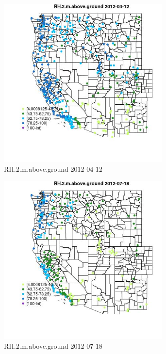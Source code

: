 \begin{figure} 
\centering  
\includegraphics[width=0.77\textwidth]{Code_Outputs/Report_ML_input_PM25_Step4_part_e_de_duplicated_aves_compiled_2019-05-14wNAs_MapObsRH2maboveground2012-04-12.jpg} 
\caption{\label{fig:Report_ML_input_PM25_Step4_part_e_de_duplicated_aves_compiled_2019-05-14wNAsMapObsRH2maboveground2012-04-12}RH.2.m.above.ground 2012-04-12} 
\end{figure} 
 

\begin{figure} 
\centering  
\includegraphics[width=0.77\textwidth]{Code_Outputs/Report_ML_input_PM25_Step4_part_e_de_duplicated_aves_compiled_2019-05-14wNAs_MapObsRH2maboveground2012-07-18.jpg} 
\caption{\label{fig:Report_ML_input_PM25_Step4_part_e_de_duplicated_aves_compiled_2019-05-14wNAsMapObsRH2maboveground2012-07-18}RH.2.m.above.ground 2012-07-18} 
\end{figure} 
 


